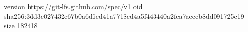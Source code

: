 version https://git-lfs.github.com/spec/v1
oid sha256:3dd3c027432c67b0a6d6ed41a7718cd4a5f443440a2fea7aeccb8dd091725c19
size 182418
